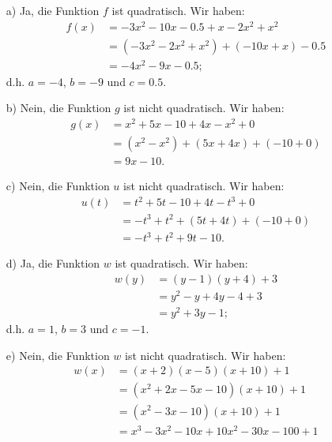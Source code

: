 \documentclass[12pt]{article}
\begin{document}
\begin{solution}
\begin{enumerate}
\item[a)] Ja, die Funktion $f$ ist quadratisch. Wir haben:
\begin{equation*}
\begin{split}
f(x)& =-3x^{2}-10x-0.5+x-2x^{2}+x^{2}\\
	  & = (-3x^{2}-2x^{2}+x^{2})+(-10x+x)-0.5\\
	  & = -4x^{2} -9x-0.5;
\end{split}
\end{equation*}
d.h. $a=-4$, $b=-9$ und $c=0.5$. 
\item[b)] Nein, die Funktion $g$ ist nicht quadratisch. Wir haben:
\begin{equation*}
\begin{split}
g(x)& =x^{2}+5x-10+4x-x^{2}+0\\
	  & = (x^{2}-x^{2})+(5x+4x)+(-10+0)\\
	  & = 9x-10.
\end{split}
\end{equation*}
\item[c)] Nein, die Funktion $u$ ist nicht quadratisch. Wir haben:
\begin{equation*}
\begin{split}
u(t)& =t^{2}+5t-10+4t-t^{3}+0\\
	  & = -t^{3}+t^{2}+(5t+4t)+(-10+0)\\
	  & = -t^{3}+t^{2}+9t-10.
\end{split}
\end{equation*}
\item[d)] Ja, die Funktion $w$ ist quadratisch. Wir haben:
\begin{equation*}
\begin{split}
w(y)& =(y-1)(y+4)+3\\
	  & = y^{2}-y+4y-4+3\\
	  & = y^{2} +3y-1;
\end{split}
\end{equation*}
d.h. $a=1$, $b=3$ und $c=-1$. 
\item[e)] Nein, die Funktion $w$ ist nicht quadratisch. Wir haben:
\begin{equation*}
\begin{split}
w(x)& =(x+2)(x-5)(x+10)+1\\
	  & =(x^{2}+2x-5x-10)(x+10)+1\\
	  & =(x^{2}-3x-10)(x+10)+1\\
	  & = x^{3}-3x^{2}-10x+10x^{2}-30x-100+1\\

\end{split}
\end{equation*}
\end{enumerate}
\end{solution}
\end{document}
